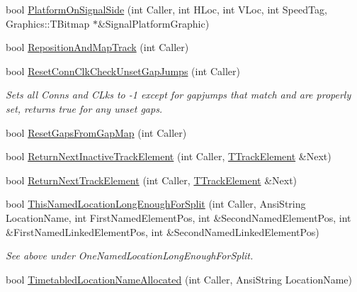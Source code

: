 \begin{DoxyCompactItemize}
bool \mbox{\hyperlink{class_t_track_a7c2888cb7acea2b9c65c5f9cc538df66}{Platform\+On\+Signal\+Side}} (int Caller, int H\+Loc, int V\+Loc, int Speed\+Tag, Graphics\+::\+T\+Bitmap $\ast$\&Signal\+Platform\+Graphic)
\item 
bool \mbox{\hyperlink{class_t_track_a5e2e215fae5247206220d301c324e9a0}{Reposition\+And\+Map\+Track}} (int Caller)
\item 
\mbox{\label{class_t_track_ac505e8a8f4097b2fc62e16e3a5a2e28b}} 
bool \mbox{\hyperlink{class_t_track_ac505e8a8f4097b2fc62e16e3a5a2e28b}{Reset\+Conn\+Clk\+Check\+Unset\+Gap\+Jumps}} (int Caller)
\begin{DoxyCompactList}\small\item\em Sets all Conns and C\+Lks to -\/1 except for gapjumps that match and are properly set, returns true for any unset gaps. \end{DoxyCompactList}\item 
bool \mbox{\hyperlink{class_t_track_a1be0a43c6b1dc736d981fe7d883d7f01}{Reset\+Gaps\+From\+Gap\+Map}} (int Caller)
\item 
bool \mbox{\hyperlink{class_t_track_a58a2afacadd0f564b474ac0faabc88d4}{Return\+Next\+Inactive\+Track\+Element}} (int Caller, \mbox{\hyperlink{class_t_track_element}{T\+Track\+Element}} \&Next)
\item 
bool \mbox{\hyperlink{class_t_track_a90e1db27659603b72a703c017ee576c8}{Return\+Next\+Track\+Element}} (int Caller, \mbox{\hyperlink{class_t_track_element}{T\+Track\+Element}} \&Next)
\item 
\mbox{\label{class_t_track_a4dffe604a7d6b14cce2c94ad7522fb7f}} 
bool \mbox{\hyperlink{class_t_track_a4dffe604a7d6b14cce2c94ad7522fb7f}{This\+Named\+Location\+Long\+Enough\+For\+Split}} (int Caller, Ansi\+String Location\+Name, int First\+Named\+Element\+Pos, int \&Second\+Named\+Element\+Pos, int \&First\+Named\+Linked\+Element\+Pos, int \&Second\+Named\+Linked\+Element\+Pos)
\begin{DoxyCompactList}\small\item\em See above under \textquotesingle{}One\+Named\+Location\+Long\+Enough\+For\+Split\textquotesingle{}. \end{DoxyCompactList}\item 
\mbox{\label{class_t_track_addd8e149e66c99a295541c9eda13eae4}} 
bool \mbox{\hyperlink{class_t_track_addd8e149e66c99a295541c9eda13eae4}{Timetabled\+Location\+Name\+Allocated}} (int Caller, Ansi\+String Location\+Name)

\end{DoxyCompactItemize}
